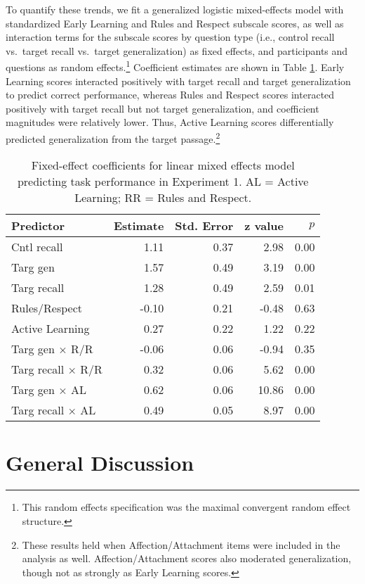 \documentclass[10pt, letterpaper]{article}
\begin{document}
To quantify these trends, we fit a generalized logistic mixed-effects
model with standardized Early Learning and Rules and Respect subscale
scores, as well as interaction terms for the subscale scores by question
type (i.e., control recall vs.~target recall vs.~target generalization)
as fixed effects, and participants and questions as random
effects.\footnote{This random effects specification was the maximal
  convergent random effect structure.} Coefficient estimates are shown
in Table \ref{tab:lmer}. Early Learning scores interacted positively
with target recall and target generalization to predict correct
performance, whereas Rules and Respect scores interacted positively with
target recall but not target generalization, and coefficient magnitudes
were relatively lower. Thus, Active Learning scores differentially
predicted generalization from the target passage.\footnote{These results
  held when Affection/Attachment items were included in the analysis as
  well. Affection/Attachment scores also moderated generalization,
  though not as strongly as Early Learning scores.}

\begin{table}[t]
\centering
\begin{tabular}{lrrrr}
  \hline
Predictor & Estimate & Std. Error & z value & $p$ \\ 
  \hline
  Cntl recall & 1.11 & 0.37 & 2.98 & 0.00 \\ 
  Targ gen & 1.57 & 0.49 & 3.19 & 0.00 \\ 
  Targ recall & 1.28 & 0.49 & 2.59 & 0.01 \\ 
  Rules/Respect & -0.10 & 0.21 & -0.48 & 0.63 \\ 
  Active Learning & 0.27 & 0.22 & 1.22 & 0.22 \\ 
  Targ gen $\times$ R/R & -0.06 & 0.06 & -0.94 & 0.35 \\ 
  Targ recall $\times$ R/R& 0.32 & 0.06 & 5.62 & 0.00 \\ 
  Targ gen $\times$ AL & 0.62 & 0.06 & 10.86 & 0.00 \\ 
  Targ recall $\times$ AL & 0.49 & 0.05 & 8.97 & 0.00 \\ 
   \hline
\end{tabular}
\caption{Fixed-effect coefficients for linear mixed effects model predicting task performance in Experiment 1. AL = Active Learning; RR = Rules and Respect.\label{tab:lmer}} 
\end{table}

\section{General Discussion}\label{general-discussion}
\end{document}

